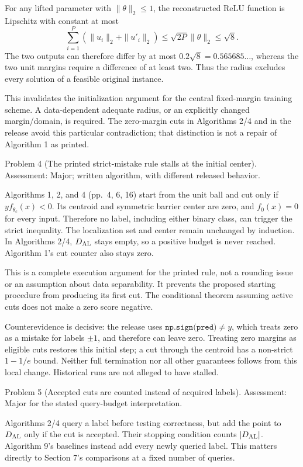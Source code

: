 \documentclass[10pt]{article}
\begin{document}
For any lifted parameter with \(\|\theta\|_2\le1\), the reconstructed ReLU function is Lipschitz with constant at most \[\sum_{i=1}^{P}(\|u_i\|_2+\|u'_i\|_2)
 \le\sqrt{2P}\|\theta\|_2\le\sqrt8.\] The two outputs can therefore differ by at most \(0.2\sqrt8=0.565685\ldots\), whereas the two unit margins require a difference of at least two. Thus the radius excludes every solution of a feasible original instance.\par
This invalidates the initialization argument for the central fixed-margin training scheme. A data-dependent adequate radius, or an explicitly changed margin/domain, is required. The zero-margin cuts in Algorithms 2/4 and in the release avoid this particular contradiction; that distinction is not a repair of Algorithm 1 as printed.\par
Problem 4 (The printed strict-mistake rule stalls at the initial center).  Assessment: Major; written algorithm, with different released behavior.\par
Algorithms 1, 2, and 4 (pp. 4, 6, 16) start from the unit ball and cut only if \(y f_{\theta_c}(x)<0\). Its centroid and symmetric barrier center are zero, and \(f_0(x)=0\) for every input. Therefore no label, including either binary class, can trigger the strict inequality. The localization set and center remain unchanged by induction. In Algorithms 2/4, \(D_{\rm AL}\) stays empty, so a positive budget is never reached. Algorithm 1’s cut counter also stays zero.\par
This is a complete execution argument for the printed rule, not a rounding issue or an assumption about data separability. It prevents the proposed starting procedure from producing its first cut. The conditional theorem assuming active cuts does not make a zero score negative.\par
Counterevidence is decisive: the release uses \(\texttt{np.sign(pred)}\ne y\), which treats zero as a mistake for labels \(\pm1\), and therefore can leave zero. Treating zero margins as eligible cuts restores this initial step; a cut through the centroid has a non-strict \(1-1/e\) bound. Neither full termination nor all other guarantees follows from this local change. Historical runs are not alleged to have stalled.\par
Problem 5 (Accepted cuts are counted instead of acquired labels).  Assessment: Major for the stated query-budget interpretation.\par
Algorithms 2/4 query a label before testing correctness, but add the point to \(D_{\rm AL}\) only if the cut is accepted. Their stopping condition counts \(|D_{\rm AL}|\). Algorithm 9’s baselines instead add every newly queried label. This matters directly to Section 7’s comparisons at a fixed number of queries.\par
\end{document}

